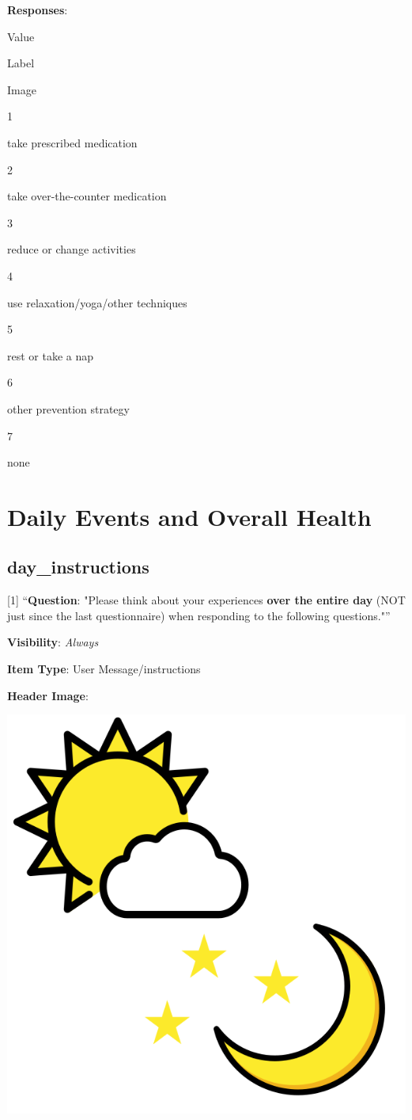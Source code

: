 \documentclass[]{book}
\begin{document}
\textbf{Responses}:

Value

Label

Image

1

take prescribed medication

2

take over-the-counter medication

3

reduce or change activities

4

use relaxation/yoga/other techniques

5

rest or take a nap

6

other prevention strategy

7

none

\hypertarget{daily_section}{%
\chapter{Daily Events and Overall Health}\label{daily_section}}

\hypertarget{day_instructions}{%
\section{day\_instructions}\label{day_instructions}}

{[}1{]} ``\textbf{Question}: "Please think about your experiences \textbf{over the entire day} (NOT just since the last questionnaire) when responding to the following questions."''

\textbf{Visibility}: \emph{Always}

\textbf{Item Type}: User Message/instructions

\textbf{Header Image}:

\begin{flushleft}\includegraphics[width=0.33\linewidth]{downloadFigs4latex_NIMH_Applet_Codebook/day_instructions_headerImg} \end{flushleft}
\end{document}
